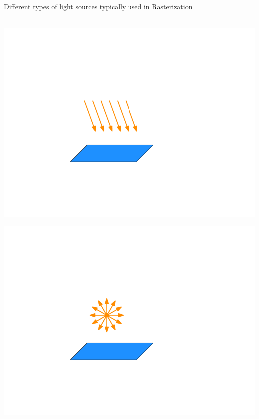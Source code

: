 \documentclass[utf8,stillsansserifmath,fleqn,t]{beamer}
\begin{document}
\begin{frame}[label=intro-light-types]
\frametitle{\insertsection}
Different types of light sources typically used in Rasterization\\~\\
\begin{minipage}{.33\textwidth}
\includegraphics[width=\textwidth]{./fig/lightsource-directional.pdf}
\end{minipage}\hfill
\begin{minipage}{.33\textwidth}
\includegraphics[width=\textwidth]{./fig/lightsource-point.pdf}
\end{minipage}\hfill
\begin{minipage}{.33\textwidth}

\end{minipage}
\end{frame}
\end{document}
